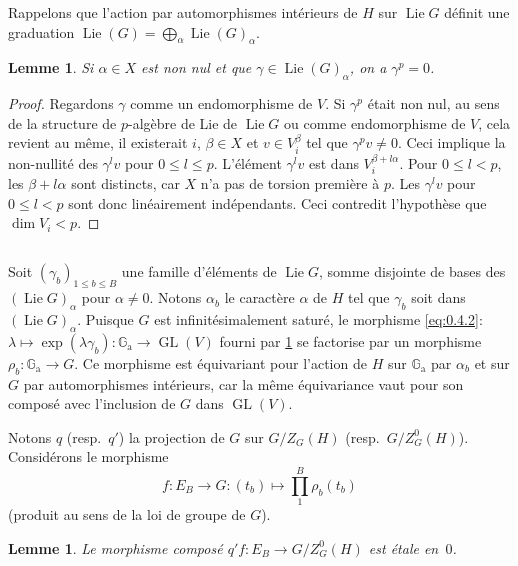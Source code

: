 \documentclass[11pt,a4paper]{article}
\theoremstyle{plain}
\newtheorem{lemma}[theorem]{Lemme}
\theoremstyle{definition}
\DeclareMathOperator{\Lie}{Lie}
\DeclareMathOperator{\GL}{GL}
\newcommand{\Ga}{\mathbb{G}_\mathrm{a}}
\begin{document}
Rappelons que l'action par automorphismes int\'erieurs de $H$ sur $\Lie G$ d\'efinit une graduation $\Lie(G) = \bigoplus_\alpha \Lie(G)_\alpha$.

\begin{lemma}\label{lem:1.12}
Si $\alpha \in X$ est non nul et que $\gamma \in \Lie(G)_\alpha$, on a $\gamma^p = 0$.
\end{lemma}

\begin{proof}
Regardons $\gamma$ comme un endomorphisme de $V$. Si $\gamma^p$ \'etait non nul, au sens de la structure de $p$-alg\`ebre de Lie de $\Lie G$ ou comme endomorphisme de $V$, cela revient au m\^eme, il existerait $i$, $\beta \in X$ et $v \in V_i^\beta$ tel que $\gamma^p v \neq 0$. Ceci implique la non-nullit\'e des $\gamma^l v$ pour $0 \leq l \leq p$. L'\'el\'ement $\gamma^l v$ est dans $V_i^{\beta + l\alpha}$. Pour $0 \leq l < p$, les $\beta + l\alpha$ sont distincts, car $X$ n'a pas de torsion premi\`ere \`a $p$. Les $\gamma^l v$ pour $0 \leq l < p$ sont donc lin\'eairement ind\'ependants. Ceci contredit l'hypoth\`ese que $\dim V_i < p$.
\end{proof}

\subsection{}
Soit $(\gamma_b)_{1 \leq b \leq B}$ une famille d'\'el\'ements de $\Lie G$, somme disjointe de bases des $(\Lie G)_\alpha$ pour $\alpha \neq 0$. Notons $\alpha_b$ le caract\`ere $\alpha$ de $H$ tel que $\gamma_b$ soit dans $(\Lie G)_\alpha$. Puisque $G$ est infinit\'esimalement satur\'e, le morphisme \ref{eq:0.4.2}: $\lambda \mapsto \exp(\lambda\gamma_b): \Ga \to \GL(V)$ fourni par \ref{lem:1.12} se factorise par un morphisme $\rho_b: \Ga \longrightarrow G$. Ce morphisme est \'equivariant pour l'action de $H$ sur $\Ga$ par $\alpha_b$ et sur $G$ par automorphismes int\'erieurs, car la m\^eme \'equivariance vaut pour son compos\'e avec l'inclusion de $G$ dans $\GL(V)$.

Notons $q$ (resp.~$q'$) la projection de $G$ sur $G/Z_G(H)$ (resp.~$G/Z^0_G(H)$). Consid\'erons le morphisme
\[
f: E_B \longrightarrow G: (t_b) \longmapsto \prod_{1}^{B} \rho_b(t_b)
\]
(produit au sens de la loi de groupe de $G$).

\begin{lemma}\label{lem:1.14}
Le morphisme compos\'e $q'f: E_B \to G/Z^0_G(H)$ est \'etale en~$0$.
\end{lemma}
\end{document}
